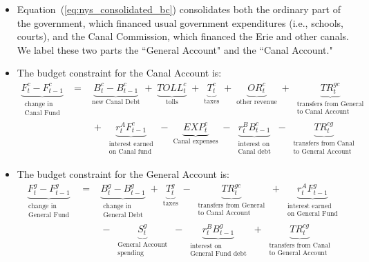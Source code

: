 \documentclass[11pt]{article}
\begin{document}
\begin{itemize}

\item Equation~(\ref{eq:nys_consolidated_bc}) consolidates both the ordinary part of the government, which financed usual government expenditures (i.e., schools, courts), and the Canal Commission, which financed the Erie and other canals.  We label these two parts the ``General Account" and the ``Canal Account."

\item The budget constraint for the Canal Account is:
\begin{eqnarray}
\underbrace{F^c_t - F^c_{t-1}}_{\substack{\text{change in}\\ \text{Canal Fund}}} \; &=& \; \underbrace{B^c_t - B^c_{t-1}}_{\text{new Canal Debt}} \; + \;
\underbrace{TOLL^c_t}_{\text{tolls}} \; + \;
\underbrace{T^c_t}_{\text{taxes}} \; + \;
\underbrace{OR^c_t}_{\text{other revenue}} \; + \;
\underbrace{TR^{gc}_t}_{\substack{\text{transfers from General}\\ \text{to Canal Account}}} \nonumber \\
&& 
\; + \;
\underbrace{r_t^A F^c_{t-1}}_{\substack{\text{interest earned}\\ \text{on Canal fund}}} 
\; - \;
\underbrace{EXP^c_t}_{\text{Canal expenses}} \; - \;
\underbrace{r_t^B B^c_{t-1}}_{\substack{\text{interest on}\\ \text{Canal debt}}} \; - \;
\underbrace{TR^{cg}_t}_{\substack{\text{transfers from Canal}\\ \text{to General Account }}}
\label{eq:canal_acct_bc}
\end{eqnarray}

\item The budget constraint for the General Account is:
\begin{eqnarray}
\underbrace{F^g_t - F^g_{t-1}}_{\substack{\text{change in}\\ \text{General Fund}}} \; &=& \; \underbrace{B^g_t - B^g_{t-1}}_{\substack{\text{change in}\\ \text{General Debt}}} \; + \;
\underbrace{T^g_t}_{\text{taxes}} \; - \;
\underbrace{TR^{gc}_t}_{\substack{\text{transfers from General}\\ \text{to Canal Account}}} \; + \;
\underbrace{r_t^A F^g_{t-1}}_{\substack{\text{interest earned}\\ \text{on General Fund}}} \nonumber \\
&& \; - \;
\underbrace{S^g_t}_{\substack{\text{General Account}\\ \text{spending}}} \; - \;
\underbrace{r_t^B B^g_{t-1}}_{\substack{\text{interest on}\\ \text{General Fund debt}}} \; + \;
\underbrace{TR^{cg}_t}_{\substack{\text{transfers from Canal}\\ \text{to General Account}}}
\label{eq:gen_acct_bc}
\end{eqnarray}


\end{itemize}
\end{document}
